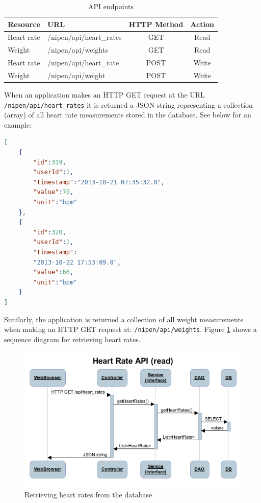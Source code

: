 \begin{table}[h]
\begin{center}
\begin{tabular}{ | l | l | c | c | }
	\hline
	Resource	& URL						& HTTP Method 	& Action \\
	\hline\noalign{\smallskip}\hline
	Heart rate	& /nipen/api/heart\_rates	& GET			& Read \\
	Weight		& /nipen/api/weights		& GET			& Read \\
	Heart rate	& /nipen/api/heart\_rate	& POST			& Write \\
	Weight		& /nipen/api/weight			& POST			& Write \\
	\hline
\end{tabular}
\end{center}
\caption{API endpoints}
\label{table:api}
\end{table}

When an application makes an HTTP GET request at the URL \verb|/nipen/api/heart_rates| it is returned a JSON
string representing a collection (array) of all heart rate measurements stored in the database.
See below for an example:
\begin{lstlisting}[language=json]
[
	{
		"id":319,
		"userId":1,
		"timestamp":"2013-10-21 07:35:32.0",
		"value":70,
		"unit":"bpm"
	},
	{
		"id":320,
		"userId":1,
		"timestamp":
		"2013-10-22 17:53:09.0",
		"value":66,
		"unit":"bpm"
	}
]
\end{lstlisting}
\label{listing:jsonarray}

Similarly, the application is returned a collection of all weight measurements when making an HTTP GET
request at: \verb|/nipen/api/weights|. Figure \ref{figure:seqhr} shows a sequence diagram for
retrieving heart rates.

\begin{figure}[h]
\centering
\includegraphics[scale=0.8]{../Figures/seqhr.png}
\caption{Retrieving heart rates from the database}
\label{figure:seqhr}
\end{figure}

